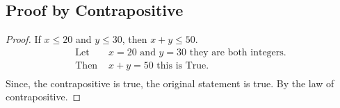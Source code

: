 \documentclass{article}
\begin{document}
\subsection*{Proof by Contrapositive}
\begin{proof}
    If $x \leq 20$ and $y \leq 30$, then $x+y \leq 50$.  
    \begin{align*}
        \text{Let } & x = 20 \text{ and } y = 30 \text{ they are both integers.} \\
        \text{Then } & x+y = 50 \text{ this is True.}\\      
        \end{align*}
    Since, the contrapositive is true, the original statement is true. By the law of contrapositive.
\end{proof}
\end{document}
